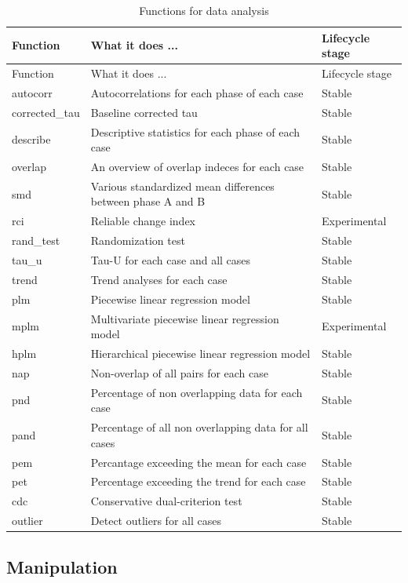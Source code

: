 \documentclass[
  letterpaper,
  DIV=11,
  numbers=noendperiod]{scrreprt}
\begin{document}
\hypertarget{tbl-functions-analysis}{}
\begin{longtable}[]{@{}lll@{}}
\caption{\label{tbl-functions-analysis}Functions for data
analysis}\tabularnewline
\toprule()
Function & What it does ... & Lifecycle stage \\
\midrule()
\endfirsthead
\toprule()
Function & What it does ... & Lifecycle stage \\
\midrule()
\endhead
autocorr & Autocorrelations for each phase of each case & Stable \\
corrected\_tau & Baseline corrected tau & Stable \\
describe & Descriptive statistics for each phase of each case &
Stable \\
overlap & An overview of overlap indeces for each case & Stable \\
smd & Various standardized mean differences between phase A and B &
Stable \\
rci & Reliable change index & Experimental \\
rand\_test & Randomization test & Stable \\
tau\_u & Tau-U for each case and all cases & Stable \\
trend & Trend analyses for each case & Stable \\
plm & Piecewise linear regression model & Stable \\
mplm & Multivariate piecewise linear regression model & Experimental \\
hplm & Hierarchical piecewise linear regression model & Stable \\
nap & Non-overlap of all pairs for each case & Stable \\
pnd & Percentage of non overlapping data for each case & Stable \\
pand & Percentage of all non overlapping data for all cases & Stable \\
pem & Percantage exceeding the mean for each case & Stable \\
pet & Percentage exceeding the trend for each case & Stable \\
cdc & Conservative dual-criterion test & Stable \\
outlier & Detect outliers for all cases & Stable \\
\bottomrule()
\end{longtable}

\hypertarget{manipulation}{%
\subsection{Manipulation}\label{manipulation}}
\end{document}
